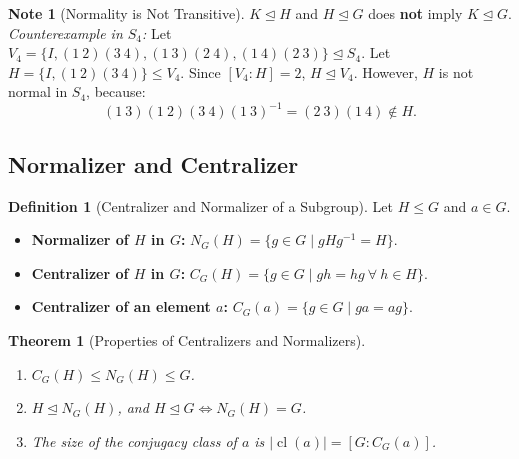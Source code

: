 \documentclass[12pt]{article}
\theoremstyle{definition}
\newtheorem{definition}{Definition}[section]
\newtheorem*{note}{Note}
\theoremstyle{plain}
\newtheorem{theorem}{Theorem}[section]
\begin{document}
\begin{note}[Normality is Not Transitive]
$K \trianglelefteq H$ and $H \trianglelefteq G$ does \textbf{not} imply $K \trianglelefteq G$.
\textit{Counterexample in $S_4$:}
Let $V_4 = \{I, (1\ 2)(3\ 4), (1\ 3)(2\ 4), (1\ 4)(2\ 3)\} \trianglelefteq S_4$.
Let $H = \{I, (1\ 2)(3\ 4)\} \le V_4$.
Since $[V_4 : H] = 2$, $H \trianglelefteq V_4$.
However, $H$ is not normal in $S_4$, because:
\[
(1\ 3)(1\ 2)(3\ 4)(1\ 3)^{-1} = (2\ 3)(1\ 4) \notin H.
\]
\end{note}

\subsection{Normalizer and Centralizer}

\begin{definition}[Centralizer and Normalizer of a Subgroup]
Let $H \le G$ and $a \in G$.
\begin{itemize}
    \item \textbf{Normalizer of $H$ in $G$:} $N_G(H) = \{g \in G \mid gHg^{-1} = H\}$.
    \item \textbf{Centralizer of $H$ in $G$:} $C_G(H) = \{g \in G \mid gh = hg \ \forall\ h \in H\}$.
    \item \textbf{Centralizer of an element $a$:} $C_G(a) = \{g \in G \mid ga = ag\}$.
\end{itemize}
\end{definition}

\begin{theorem}[Properties of Centralizers and Normalizers]
\begin{enumerate}
    \item $C_G(H) \le N_G(H) \le G$.
    \item $H \trianglelefteq N_G(H)$, and $H \trianglelefteq G \iff N_G(H) = G$.
    \item The size of the conjugacy class of $a$ is $|\operatorname{cl}(a)| = [G : C_G(a)]$.
\end{enumerate}
\end{theorem}


\end{document}

